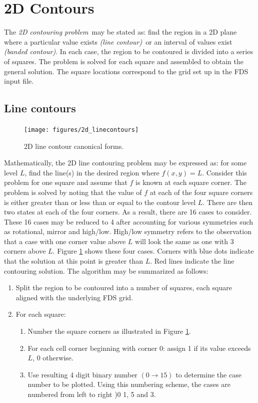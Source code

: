 \documentclass[11pt,twoside]{book}
\newcommand{\figoptions}{P}
\begin{document}
\section{2D Contours}


The {\em 2D contouring problem}\ may be stated as: find the region in a 2D plane where a particular value exists {\em (line contour)}\ or an interval of values exist {\em (banded contour)}.   In each case, the  region to be contoured is divided into a series of squares.  The problem is solved for each square and assembled to obtain the general solution.  The square locations correspond to the grid set up in the FDS input file.

\subsection{Line contours}
\begin{figure}[\figoptions]
\begin{center}
\texttt{[image: figures/2d\_linecontours]}
\end{center}
\caption{2D line contour canonical forms.
  }
\label{fig2dline}%
\end{figure}
Mathematically, the 2D line contouring problem may be expressed as: for some level $L$, find the line(s) in the desired region where $f(x,y)=L$.  Consider this problem for one square and assume that $f$ is known at each square corner.  The problem is solved by noting that the value of $f$ at each of the four square corners is either greater than or less than or equal to the contour level $L$.  There are then two states at each of the four corners.  As a result, there are 16 cases to consider.  These 16 cases may be reduced to 4 after accounting for various symmetries such as rotational, mirror and high/low.  High/low symmetry refers to the observation that a case with one corner value above $L$ will look the same as one with 3 corners above $L$.
Figure \ref{fig2dline} shows these four cases.  Corners with blue dots indicate that the solution at this point is greater than $L$.  Red lines indicate the line contouring solution.  The algorithm may be summarized as follows:
\begin{enumerate}
\item Split the region to be contoured into a number of squares, each square aligned with the underlying FDS grid.
\item For  each square:
\begin{enumerate}
\item Number the square corners as illustrated in Figure \ref{fig2dline}.
\item For each cell corner beginning with corner 0: assign 1 if its value exceeds $L$, 0 otherwise.
\item Use resulting 4 digit binary number $(0\rightarrow 15)$ to determine the case number to be plotted.  Using this numbering scheme, the cases are numbered from left to right )0 1, 5 and 3.
\end{enumerate}
\end{enumerate}
\end{document}
